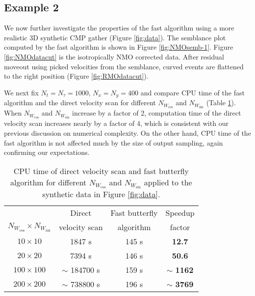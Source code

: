 




\subsection{Example 2}

We now further investigate the properties of the fast algorithm using a more realistic 3D synthetic CMP gather (Figure \ref{fig:data}). The semblance plot computed by the fast algorithm is shown in Figure \ref{fig:NMOsemb-1}. Figure \ref{fig:NMOdatacut} is the isotropically NMO corrected data. After residual moveout using picked velocities from the semblance, curved events are flattened to the right position (Figure \ref{fig:RMOdatacut}).

We next fix $N_t=N_{\tau}=1000$, $N_x=N_y=400$ and compare CPU time of the fast algorithm and the direct velocity scan for different $N_{W_{\cos}}$ and $N_{W_{\sin}}$ (Table \ref{table1}). When $N_{W_{\cos}}$ and $N_{W_{\sin}}$ increase by a factor of 2, computation time of the direct velocity scan increases nearly by a factor of 4, which is consistent with our previous discussion on numerical complexity. On the other hand, CPU time of the fast algorithm is not affected much by the size of output sampling, again confirming our expectations.



\begin{table}
\centering
\begin{tabular}{ c c c c}
\hline
  &  Direct & Fast butterfly & Speedup\\ 
 $N_{W_{\cos}}\times N_{W_{\sin}}$ & velocity scan & algorithm & factor\\ \hline
$10\times 10$ & 1847 s& 145 s & {\bf 12.7}\\ \hline
$20\times 20$& 7394 s & 146 s & {\bf 50.6}\\  \hline
$100\times 100$ & $\sim$ 184700 s & 159 s & $\sim$ {\bf 1162}\\ \hline
$200\times 200$ & $\sim$ 738800 s & 196 s & $\sim$ {\bf 3769}\\ \hline
\end{tabular}
\caption{CPU time of direct velocity scan and fast butterfly algorithm for different $N_{W_{\cos}}$ and $N_{W_{\sin}}$ applied to the synthetic data in Figure \ref{fig:data}.}
\label{table1}
\end{table}

